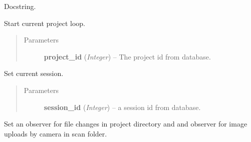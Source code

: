 \documentclass[letterpaper,10pt,english]{sphinxmanual}
\begin{document}
\begin{fulllineitems}
\begin{fulllineitems}
\end{fulllineitems}


\begin{fulllineitems}
\label{state:state.State.remove_observer}
Docstring.

\end{fulllineitems}


\begin{fulllineitems}
\label{state:state.State.set_current_project}
Start current project loop.
\begin{quote}\begin{description}
\item[{Parameters}] \leavevmode
\textbf{project\_id} (\emph{Integer}) -- The project id from database.

\end{description}\end{quote}

\end{fulllineitems}


\begin{fulllineitems}
\label{state:state.State.set_current_session}
Set current session.
\begin{quote}\begin{description}
\item[{Parameters}] \leavevmode
\textbf{session\_id} (\emph{Integer}) -- a session id from database.

\end{description}\end{quote}

\end{fulllineitems}


\begin{fulllineitems}
\label{state:state.State.set_observer}
Set an observer for file changes in project directory and
and observer for image uploads by camera in scan folder.


\end{fulllineitems}
\end{fulllineitems}
\end{document}
